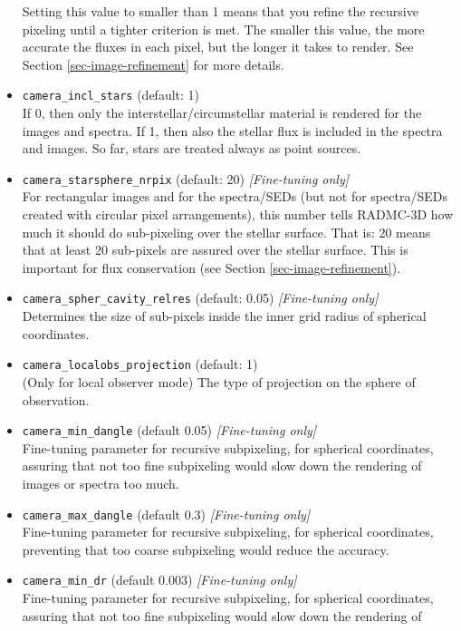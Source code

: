 \documentclass{report}
\begin{document}
\begin{itemize}
  Setting this value to smaller than 1 means that you refine the recursive
  pixeling until a tighter criterion is met. The smaller this value, the
  more accurate the fluxes in each pixel, but the longer it takes to
  render. See Section \ref{sec-image-refinement} for more details.
\item {\small\tt camera\_incl\_stars} (default: 1)\\
  If 0, then only the interstellar/circumstellar material is rendered
  for the images and spectra. If 1, then also the stellar flux is 
  included in the spectra and images. So far, stars are treated always
  as point sources.
\item {\small\tt camera\_starsphere\_nrpix} (default: 20) {\em [Fine-tuning only]}\\
  For rectangular images and for the spectra/SEDs (but not for spectra/SEDs
  created with circular pixel arrangements), this number tells RADMC-3D how
  much it should do sub-pixeling over the stellar surface. That is: 20 means
  that at least 20 sub-pixels are assured over the stellar surface. This is
  important for flux conservation (see Section \ref{sec-image-refinement}).
\item {\small\tt camera\_spher\_cavity\_relres} (default: 0.05) {\em [Fine-tuning only]}\\
  Determines the size of sub-pixels inside the inner grid radius of
  spherical coordinates.
\item {\small\tt camera\_localobs\_projection} (default: 1)\\
  (Only for local observer mode) The type of projection on the sphere of
  observation.
\item {\small\tt camera\_min\_dangle} (default 0.05) {\em [Fine-tuning only]}\\
  Fine-tuning parameter for recursive subpixeling, for spherical coordinates, 
  assuring that not too fine subpixeling would slow down the rendering of
  images or spectra too much.
\item {\small\tt camera\_max\_dangle} (default 0.3) {\em [Fine-tuning only]}\\
  Fine-tuning parameter for recursive subpixeling, for spherical coordinates, 
  preventing that too coarse subpixeling would reduce the accuracy. 
\item {\small\tt camera\_min\_dr} (default 0.003) {\em [Fine-tuning only]}\\
  Fine-tuning parameter for recursive subpixeling, for spherical coordinates, 
  assuring that not too fine subpixeling would slow down the rendering of

\end{itemize}
\end{document}
